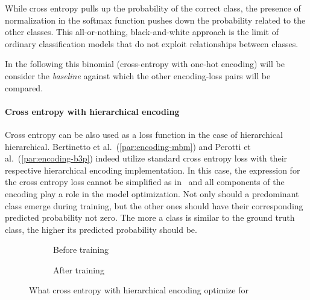 While cross entropy pulls up the probability of the correct class, the presence of normalization in the softmax function pushes down the probability related to the other classes. This all-or-nothing, black-and-white approach is the limit of ordinary classification models that do not exploit relationships between classes.

In the following this binomial (cross-entropy with one-hot encoding) will be consider the \emph{baseline} against which the other encoding-loss pairs will be compared.

\paragraph{Cross entropy with hierarchical encoding} Cross entropy can be also used as a loss function in the case of hierarchical hierarchical. Bertinetto et al.~(\ref{par:encoding-mbm}) and Perotti et al.~(\ref{par:encoding-b3p}) indeed utilize standard cross entropy loss with their respective hierarchical encoding implementation. In this case, the expression for the cross entropy loss cannot be simplified as in~ and all components of the encoding play a role in the model optimization.
Not only should a predominant class emerge during training, but the other ones should have their corresponding predicted probability not zero. The more a class is similar to the ground truth class, the higher its predicted probability should be.
\begin{figure}[htbp]
  \centering
  \begin{subfigure}{0.45\textwidth}
    \centering
    \begin{minipage}{\textwidth}
      \resizebox{\linewidth}{!}{}
    \end{minipage}
    \caption{Before training}
    \label{fig:03/xe-hier-before}
  \end{subfigure}
  \begin{subfigure}{0.45\textwidth}
    \centering
    \begin{minipage}{\textwidth}
      \resizebox{\linewidth}{!}{}
    \end{minipage}
    \caption{After training}
    \label{fig:03/xe-hier-after}
  \end{subfigure}
  \caption{What cross entropy with hierarchical encoding optimize for}  %
\end{figure}

